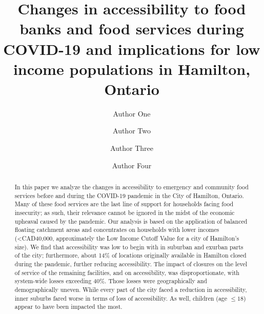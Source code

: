 \documentclass[]{elsarticle} %
\begin{document}
\begin{frontmatter}

  \title{Changes in accessibility to food banks and food services during
COVID-19 and implications for low income populations in Hamilton,
Ontario}
    \author[Some University]{Author One}
    \author[Another University]{Author Two}
    \author[Some University]{Author Three}
    \author[Some University]{Author Four}
      \address[Some University]{Department, Street, City, State, Zip}
    \address[Another University]{Department, Street, City, State, Zip}
  
  \begin{abstract}
  In this paper we analyze the changes in accessibility to emergency and
  community food services before and during the COVID-19 pandemic in the
  City of Hamilton, Ontario. Many of these food services are the last
  line of support for households facing food insecurity; as such, their
  relevance cannot be ignored in the midst of the economic upheaval
  caused by the pandemic. Our analysis is based on the application of
  balanced floating catchment areas and concentrates on households with
  lower incomes (\textless CAD40,000, approximately the Low Income
  Cutoff Value for a city of Hamilton's size). We find that
  accessibility was low to begin with in suburban and exurban parts of
  the city; furthermore, about 14\% of locations originally available in
  Hamilton closed during the pandemic, further reducing accessibility.
  The impact of closures on the level of service of the remaining
  facilities, and on accessibility, was disproportionate, with
  system-wide losses exceeding 40\%. Those losses were geographically
  and demographically uneven. While every part of the city faced a
  reduction in accessibility, inner suburbs fared worse in terms of loss
  of accessibility. As well, children (age \(\le 18\)) appear to have
  been impacted the most.
  \end{abstract}
  
 \end{frontmatter}
\end{document}
